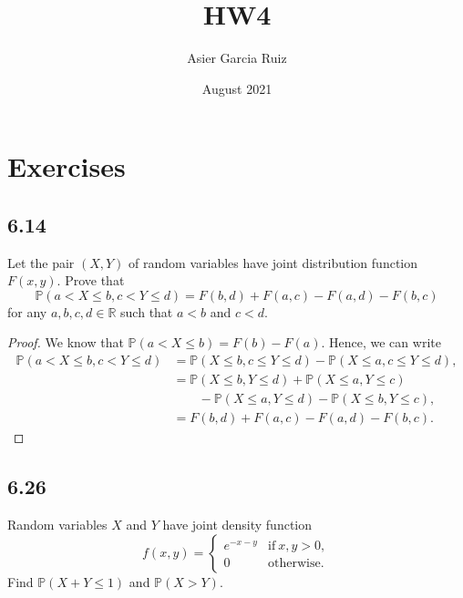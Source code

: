 \documentclass{article}
\title{HW4}
\author{Asier Garcia Ruiz }
\date{August 2021}
\newcommand{\R}{\mathbb{R}}
\renewcommand{\P}[1]{\mathbb{P}(#1)}
\begin{document}
\maketitle

\section*{Exercises}
\subsection*{6.14}
Let the pair $(X,Y)$ of random variables have joint distribution function
$F(x,y)$. Prove that
\[\P{a<X \leq b, c<Y\leq d} = F(b,d) + F(a,c) - F(a,d) - F(b,c)\]
for any $a,b,c,d \in \R$ such that $a < b$ and $c < d$.

\begin{proof}
    We know that $\P{a < X \leq b} = F(b) - F(a)$. Hence, we can write
    \begin{align*}
        \P{a<X \leq b, c<Y\leq d} & = \P{X \leq b, c \leq Y \leq d} - \P{X \leq a, c \leq Y \leq d}, \\
                                  & = \P{X \leq b, Y \leq d} + \P{X \leq a, Y \leq c}                \\
                                  & \qquad - \P{X \leq a, Y \leq d} - \P{X \leq b, Y \leq c},        \\
                                  & = F(b,d) + F(a,c) - F(a,d) - F(b,c).
    \end{align*}
\end{proof}

\subsection*{6.26}
Random variables $X$ and $Y$ have joint density function
\begin{equation*}
    f(x,y) = \begin{cases}
        e^{-x-y} & \text{if} \ x,y > 0, \\
        0        & \text{otherwise}.
    \end{cases}
\end{equation*}
Find $\P{X+Y \leq 1}$ and $\P{X>Y}$.
\end{document}
